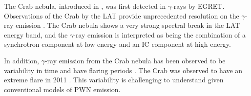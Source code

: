 The Crab nebula, introduced in , was first detected
in $\gamma$-rays by \ac{EGRET}.  Observations of the Crab by the
\ac{LAT} provide unprecedented resolution on the $\gamma$-ray emission
\cite{abdo_2010a_fermi-large}.  The Crab nebula shows a very strong
spectral break in the \ac{LAT} energy band, and the $\gamma$-ray emission
is interpreted as being the combination of a synchrotron component at low
energy and an \ac{IC} component at high energy.

In addition, $\gamma$-ray emission from the Crab nebula has
been observed to be variability in time and have flaring periods
\citep{abdo_2011a_gamma-ray-flares}.  The Crab was observed to have
an extreme flare in 2011 \citep{buehler_2012a_gamma-ray-activity}.
This variability is challenging to understand given conventional models
of \ac{PWN} emission.

\subsubsection{\velax}

